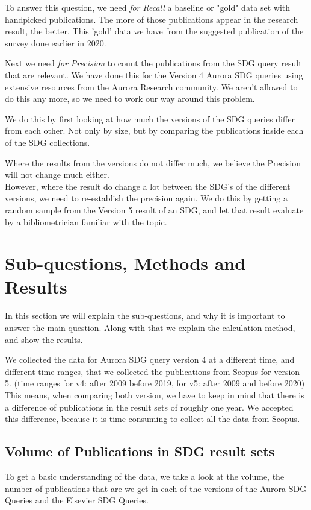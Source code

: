 \documentclass{article}
\begin{document}
To answer this question, we need \emph{for Recall} a baseline or "gold" data set with handpicked publications. The more of those publications appear in the research result, the better. This 'gold' data we have from the suggested publication of the survey done earlier in 2020.\cite{vanderfeesten_survey_2020}

Next we need \emph{for Precision} to count the publications from the SDG query result that are relevant. We have done this for the Version 4 Aurora SDG queries using extensive resources from the Aurora Research community. We aren't allowed to do this any more, so we need to work our way around this problem.

We do this by first looking at how much the versions of the SDG queries differ from each other. Not only by size, but by comparing the publications inside each of the SDG collections.

Where the results from the versions do not differ much, we believe the Precision will not change much either. \\
However, where the result do change a lot between the SDG's of the different versions, we need to re-establish the precision again. We do this by getting a random sample from the Version 5 result of an SDG, and let that result evaluate by a bibliometrician familiar with the topic.

\section{Sub-questions, Methods and Results}
In this section we will explain the sub-questions, and why it is important to answer the main question. Along with that we explain the calculation method, and show the results.

We collected the data for Aurora SDG query version 4 at a different time, and different time ranges, that we collected the publications from Scopus for version 5. (time ranges for v4: after 2009 before 2019, for v5: after 2009 and before 2020) This means, when comparing both version, we have to keep in mind that there is a difference of publications in the result sets of roughly one year. We accepted this difference, because it is time consuming to collect all the data from Scopus. 

\subsection{Volume of Publications in SDG result sets}
To get a basic understanding of the data, we take a look at the volume, the number of publications that are we get in each of the versions of the Aurora SDG Queries and the Elsevier SDG Queries.
\end{document}
